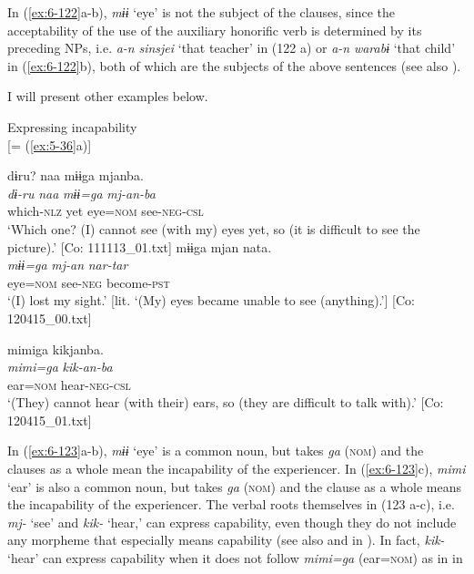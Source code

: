 In (\ref{ex:6-122}a-b), \textit{mɨɨ} ‘eye’ is not the subject of the clauses, since the acceptability of the use of the auxiliary honorific verb is determined by its preceding NPs, i.e. \textit{a-n} \textit{sinsjei} ‘that teacher’ in (122 a) or \textit{a-n} \textit{warabɨ} ‘that child’ in (\ref{ex:6-122}b), both of which are the subjects of the above sentences (see also ).

  I will present other examples below.

\ea\label{ex:6-123}
 Expressing incapability\\
\ea{}  [= (\ref{ex:5-36}a)]

{\TM}
\glll dɨru?  naa  mɨɨga  mjanba.\\
      \textit{dɨ-ru}  \textit{naa}  \textit{mɨɨ=ga}  \textit{mj-an-ba}\\
      which-\textsc{nlz}  yet  eye=\textsc{nom}  see-\textsc{neg}-\textsc{csl}\\
\glt ‘Which one? (I) cannot see (with my) eyes yet, so (it is difficult to see the picture).’ [Co: 111113\_01.txt]
\ex
{\TM}
\gll mɨɨga  mjan  nata.\\
      \textit{mɨɨ=ga}  \textit{mj-an}  \textit{nar-tar}\\
      eye=\textsc{nom}  see-\textsc{neg}  become-\textsc{pst}\\
\glt ‘(I) lost my sight.’ [lit. ‘(My) eyes became unable to see (anything).’]      [Co: 120415\_00.txt]

\ex
{\TM}
\glll mimiga  kikjanba.\\
 \textit{mimi=ga}  \textit{kik-an-ba}\\
ear=\textsc{nom}  hear-\textsc{neg}-\textsc{csl}\\
\glt ‘(They) cannot hear (with their) ears, so (they are difficult to talk with).’ [Co: 120415\_01.txt]
\z
\z

In (\ref{ex:6-123}a-b), \textit{mɨɨ} ‘eye’ is a common noun, but takes \textit{ga} (\textsc{nom}) and the clauses as a whole mean the incapability of the experiencer. In (\ref{ex:6-123}c), \textit{mimi} ‘ear’ is also a common noun, but takes \textit{ga} (\textsc{nom}) and the clause as a whole means the incapability of the experiencer. The verbal roots themselves in (123 a-c), i.e. \textit{mj-} ‘see’ and \textit{kik-} ‘hear,’ can express capability, even though they do not include any morpheme that especially means capability (see also  and  in ). In fact, \textit{kik-} ‘hear’ can express capability when it does not follow \textit{mimi=ga} (ear=\textsc{nom}) as in  in 

